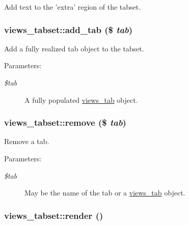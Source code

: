 Add text to the 'extra' region of the tabset. \hypertarget{classviews__tabset_ebabe797dcf1de48823d819369de57de}{
\subsubsection[{add\_\-tab}]{\setlength{\rightskip}{0pt plus 5cm}views\_\-tabset::add\_\-tab (\$ {\em tab})}}
\label{classviews__tabset_ebabe797dcf1de48823d819369de57de}


Add a fully realized tab object to the tabset.

\begin{Desc}
\item[Parameters:]
\begin{description}
\item[{\em \$tab}]A fully populated \hyperlink{classviews__tab}{views\_\-tab} object. \end{description}
\end{Desc}
\hypertarget{classviews__tabset_26ae206ad01174f0601ae90971e11071}{
\subsubsection[{remove}]{\setlength{\rightskip}{0pt plus 5cm}views\_\-tabset::remove (\$ {\em tab})}}
\label{classviews__tabset_26ae206ad01174f0601ae90971e11071}


Remove a tab.

\begin{Desc}
\item[Parameters:]
\begin{description}
\item[{\em \$tab}]May be the name of the tab or a \hyperlink{classviews__tab}{views\_\-tab} object. \end{description}
\end{Desc}
\hypertarget{classviews__tabset_9f0d471c518fe5877dd0d9ca044fa154}{
\subsubsection[{render}]{\setlength{\rightskip}{0pt plus 5cm}views\_\-tabset::render ()}}
\label{classviews__tabset_9f0d471c518fe5877dd0d9ca044fa154}



